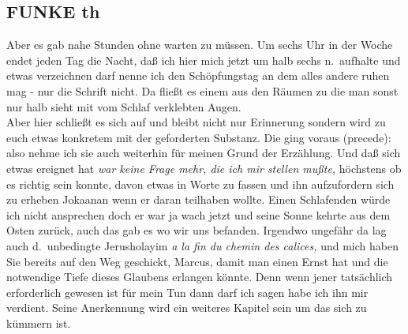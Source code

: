 \documentclass[
]{article}
\author{}
\date{\vspace{-2.5em}}
\begin{document}
\subsection{FUNKE th}\label{funke-th}

Aber es gab nahe Stunden ohne warten zu müssen. Um sechs Uhr in der
Woche endet jeden Tag die Nacht, daß ich hier mich jetzt um halb sechs
n.~aufhalte und etwas verzeichnen darf nenne ich den Schöpfungstag an
dem alles andere ruhen mag - nur die Schrift nicht. Da fließt es einem
aus den Räumen zu die man sonst nur halb sieht mit vom Schlaf verklebten
Augen.\\
Aber hier schließt es sich auf und bleibt nicht nur Erinnerung sondern
wird zu euch etwas konkretem mit der geforderten Substanz. Die ging
voraus (precede): also nehme ich sie auch weiterhin für meinen Grund der
Erzählung. Und daß sich etwas ereignet hat \emph{war keine Frage mehr,
die ich mir stellen mußte,} höchstens ob es richtig sein konnte, davon
etwas in Worte zu fassen und ihn aufzufordern sich zu erheben Jokaanan
wenn er daran teilhaben wollte. Einen Schlafenden würde ich nicht
ansprechen doch er war ja wach jetzt und seine Sonne kehrte aus dem
Osten zurück, auch das gab es wo wir uns befanden. Irgendwo ungefähr da
lag auch d.~unbedingte Jerusholayim \emph{a la fin du chemin des
calices,} und mich haben Sie bereits auf den Weg geschickt, Marcus,
damit man einen Ernst hat und die notwendige Tiefe dieses Glaubens
erlangen könnte. Denn wenn jener tatsächlich erforderlich gewesen ist
für mein Tun dann darf ich sagen habe ich ihn mir verdient. Seine
Anerkennung wird ein weiteres Kapitel sein um das sich zu kümmern ist.
\end{document}

